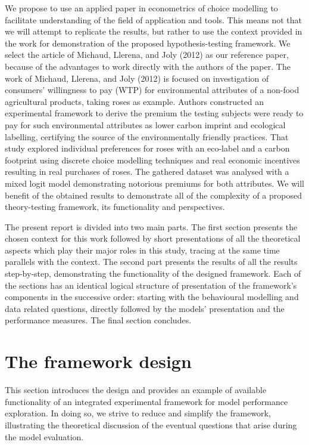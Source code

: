 \documentclass[12pt,]{article}
\begin{document}
We propose to use an applied paper in econometrics of choice modelling
to facilitate understanding of the field of application and tools. This
means not that we will attempt to replicate the results, but rather to
use the context provided in the work for demonstration of the proposed
hypothesis-testing framework. We select the article of Michaud, Llerena,
and Joly (2012) as our reference paper, because of the advantages to
work directly with the authors of the paper. The work of Michaud,
Llerena, and Joly (2012) is focused on investigation of consumers'
willingness to pay (WTP) for environmental attributes of a non-food
agricultural products, taking roses as example. Authors constructed an
experimental framework to derive the premium the testing subjects were
ready to pay for such environmental attributes as lower carbon imprint
and ecological labelling, certifying the source of the environmentally
friendly practices. That study explored individual preferences for roses
with an eco-label and a carbon footprint using discrete choice modelling
techniques and real economic incentives resulting in real purchases of
roses. The gathered dataset was analysed with a mixed logit model
demonstrating notorious premiums for both attributes. We will benefit of
the obtained results to demonstrate all of the complexity of a proposed
theory-testing framework, its functionality and perspectives.

The present report is divided into two main parts. The first section
presents the chosen context for this work followed by short
presentations of all the theoretical aspects which play their major
roles in this study, tracing at the same time parallels with the
context. The second part presents the results of all the results
step-by-step, demonstrating the functionality of the designed framework.
Each of the sections has an identical logical structure of presentation
of the framework's components in the successive order: starting with the
behavioural modelling and data related questions, directly followed by
the models' presentation and the performance measures. The final section
concludes.

\newpage

\hypertarget{the-framework-design}{%
\section{The framework design}\label{the-framework-design}}

This section introduces the design and provides an example of available
functionality of an integrated experimental framework for model
performance exploration. In doing so, we strive to reduce and simplify
the framework, illustrating the theoretical discussion of the eventual
questions that arise during the model evaluation.
\end{document}
